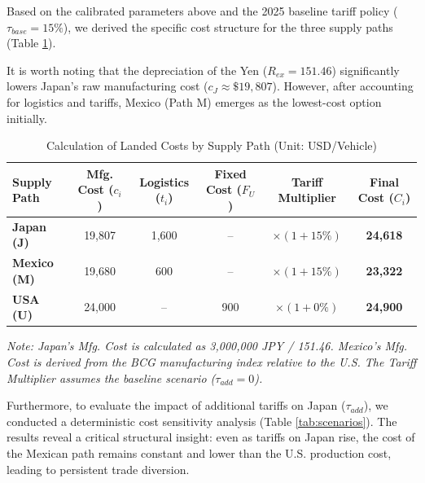 \documentclass{apmcmthesis}
\begin{document}
Based on the calibrated parameters above and the 2025 baseline tariff policy ($\tau_{base}=15\%$), we derived the specific cost structure for the three supply paths (Table \ref{tab:cost_calculation}). 

It is worth noting that the depreciation of the Yen ($R_{ex}=151.46$) significantly lowers Japan's raw manufacturing cost ($c_J \approx \$19,807$). However, after accounting for logistics and tariffs, Mexico (Path M) emerges as the lowest-cost option initially.

\begin{table}[H]
\centering
\caption{Calculation of Landed Costs by Supply Path (Unit: USD/Vehicle)}
\begin{tabular}{lccccc}
\toprule
\textbf{Supply Path} & \textbf{Mfg. Cost ($c_i$)} & \textbf{Logistics ($t_i$)} & \textbf{Fixed Cost ($F_U$)} & \textbf{Tariff Multiplier} & \textbf{Final Cost ($C_i$)} \\
\midrule
\textbf{Japan (J)} & 19,807 & 1,600 & -- & $\times (1 + 15\%)$ & \textbf{24,618} \\
\textbf{Mexico (M)} & 19,680 & 600 & -- & $\times (1 + 15\%)$ & \textbf{23,322} \\
\textbf{USA (U)} & 24,000 & -- & 900 & $\times (1 + 0\%)$ & \textbf{24,900} \\
\bottomrule
\end{tabular}
\label{tab:cost_calculation}
\vspace{0.5em}
\parbox{0.9\textwidth}{\footnotesize \textit{Note: Japan's Mfg. Cost is calculated as 3,000,000 JPY / 151.46. Mexico's Mfg. Cost is derived from the BCG manufacturing index relative to the U.S. The Tariff Multiplier assumes the baseline scenario ($\tau_{add}=0$).}}
\end{table}

Furthermore, to evaluate the impact of additional tariffs on Japan ($\tau_{add}$), we conducted a deterministic cost sensitivity analysis (Table \ref{tab:scenarios}). The results reveal a critical structural insight: even as tariffs on Japan rise, the cost of the Mexican path remains constant and lower than the U.S. production cost, leading to persistent trade diversion.
\end{document}

